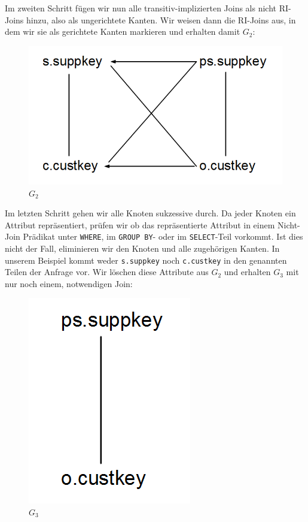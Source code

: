 Im zweiten Schritt fügen wir nun alle transitiv-implizierten Joins als nicht RI-Joins hinzu, also als ungerichtete Kanten. Wir weisen dann die RI-Joins aus, in dem wir sie als gerichtete Kanten markieren und erhalten damit $G_2$:

\begin{figure}[h]
\includegraphics[scale=0.4]{Bilder/joinelem_g2.png}
\caption{$G_2$}
\end{figure}

Im letzten Schritt gehen wir alle Knoten sukzessive durch. Da jeder Knoten ein Attribut repräsentiert, prüfen wir ob das repräsentierte Attribut in einem Nicht-Join Prädikat unter \verb|WHERE|, im \verb|GROUP BY|- oder im \verb|SELECT|-Teil vorkommt. Ist dies nicht der Fall, eliminieren wir den Knoten und alle zugehörigen Kanten. In unserem Beispiel kommt weder \verb|s.suppkey| noch \verb|c.custkey| in den genannten Teilen der Anfrage vor. Wir löschen diese Attribute aus $G_2$ und erhalten $G_3$ mit nur noch einem, notwendigen Join:

\begin{figure}[h]
\includegraphics[scale=0.4]{Bilder/joinelem_g3.png}
\caption{$G_3$}
\end{figure}

